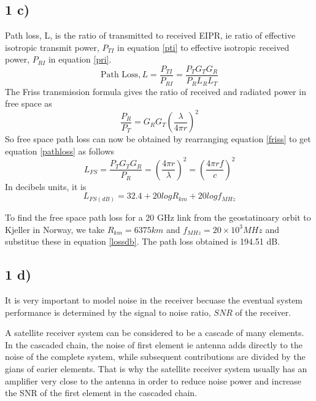 \documentclass[11pt, oneside]{article}   	%
\begin{document}
\subsection*{1 c)}
Path loss, L, is the ratio of transmitted to received EIPR, ie ratio of effective isotropic transmit power, $P_{TI}$ in equation \ref{pti} to effective isotropic received power, $P_{RI}$ in equation \ref{pri}.
\begin{equation} \label{pathloss}
\text{Path Loss}, L = \frac{P_{TI}}{P_{RI}} = \frac{P_TG_TG_R}{P_RL_RL_T}
\end{equation}
The Friss transmission formula gives the ratio of received and radiated power in free space as 
\begin{equation}  \label{friss}
\frac{P_R}{P_T} = G_RG_T\left(\frac{\lambda}{4\pi r}\right)^2
\end{equation}
So free space path loss can now be obtained by rearranging equation \ref{friss} to get equation \ref{pathloss} as follows
\begin{equation*}
L_{FS} = \frac{P_TG_TG_R}{P_R} = \left(\frac{4\pi r}{\lambda}\right)^2 = \left(\frac{4\pi rf}{c}\right)^2
\end{equation*}
In decibels units, it is 
\begin{equation} \label{lossdb}
L_{FS(dB)} = 32.4 + 20logR_{km} + 20logf_{MHz}
\end{equation}

To find the free space path loss for a 20 GHz link from the geostatinoary orbit to Kjeller in Norway, we take $R_{km} = 6375 km$ and $f_{MHz} = 20\times 10^3 MHz$ and substitue these in equation \ref{lossdb}. The path loss obtained is 194.51 dB.

\subsection*{1 d)}
It is very important to model noise in the receiver becuase the eventual system performance is determined by the signal to noise ratio, $SNR$ of the receiver. 

A satellite receiver system can be considered to be a cascade of many elements. In the cascaded chain, the noise of first element ie antenna adds directly to the noise of the complete system, while subsequent contributions are divided by the gians of earier elements. That is why the satellite receiver system usually has an amplifier very close to the antenna in order to reduce noise power and increase the SNR of the first element in the cascaded chain.
\end{document}
